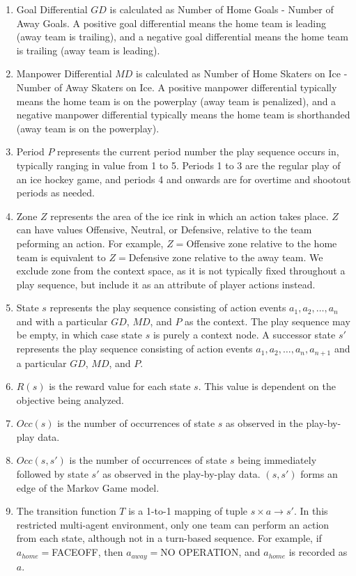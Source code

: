 \documentclass[]{article}
\begin{document}
\begin{enumerate}
\item Goal Differential $GD$ is calculated as Number of Home Goals - Number of Away Goals. A positive goal differential means the home team is leading (away team is trailing), and a negative goal differential means the home team is trailing (away team is leading).
\item Manpower Differential $MD$ is calculated as Number of Home Skaters on Ice - Number of Away Skaters on Ice. A positive manpower differential typically means the home team is on the powerplay (away team is penalized), and a negative manpower differential typically means the home team is shorthanded (away team is on the powerplay).
\item Period $P$ represents the current period number the play sequence occurs in, typically ranging in value from 1 to 5. Periods 1 to 3 are the regular play of an ice hockey game, and periods 4 and onwards are for overtime and shootout periods as needed.
\item Zone $Z$ represents the area of the ice rink in which an action takes place. $Z$ can have values Offensive, Neutral, or Defensive, relative to the team peforming an action. For example, $Z=$Offensive zone relative to the home team is equivalent to $Z=$Defensive zone relative to the away team. We exclude zone from the context space, as it is not typically fixed throughout a play sequence, but include it as an attribute of player actions instead.
\item State $s$ represents the play sequence consisting of action events $a_1,a_2,\ldots,a_n$ and with a particular $GD$, $MD$, and $P$ as the context. The play sequence may be empty, in which case state $s$ is purely a context node. A successor state $s'$ represents the play sequence consisting of action events $a_1,a_2,\ldots,a_n,a_{n+1}$ and a particular $GD$, $MD$, and $P$.
\item $R(s)$ is the reward value for each state $s$. This value is dependent on the objective being analyzed.
\item $Occ(s)$ is the number of occurrences of state $s$ as observed in the play-by-play data.
\item $Occ(s,s')$ is the number of occurrences of state $s$ being immediately followed by state $s'$ as observed in the play-by-play data. $(s,s')$ forms an edge of the Markov Game model.
\item The transition function $T$ is a 1-to-1 mapping of tuple $s \times a \rightarrow s'$. In this restricted multi-agent environment, only one team can perform an action from each state, although not in a turn-based sequence. For example, if $a_{home}=$FACEOFF, then $a_{away}=$NO OPERATION, and $a_{home}$ is recorded as $a$.

\end{enumerate}
\end{document}
